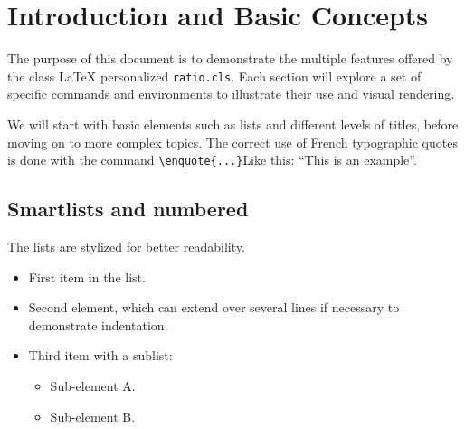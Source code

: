 \documentclass{mytex}
\begin{document}
\fairepagedegarde

\fairemarges


\tabledematieres


\section{Introduction and Basic Concepts}

The purpose of this document is to demonstrate the multiple features offered by the class \LaTeX{} personalized \texttt{ratio.cls}. Each section will explore a set of specific commands and environments to illustrate their use and visual rendering.


We will start with basic elements such as lists and different levels of titles, before moving on to more complex topics. The correct use of French typographic quotes is done with the command \verb|\enquote{...}|Like this: \enquote{This is an example}.

\subsection{Smartlists and numbered}

The lists are stylized for better readability.

\begin{itemize}
	\item First item in the list.
	\item Second element, which can extend over several lines if necessary to demonstrate indentation.
	\item Third item with a sublist:
	\begin{itemize}
		\item Sub-element A.
		\item Sub-element B.
	\end{itemize}
\end{itemize}
\end{document}
